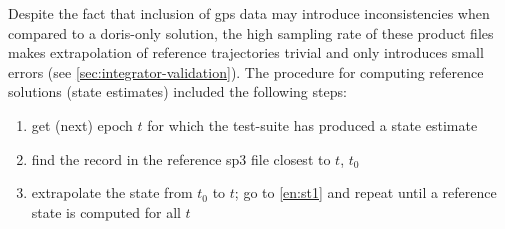 Despite the fact that inclusion of \gls{gps} data may introduce inconsistencies 
when compared to a \gls{doris}-only solution, the high sampling rate of these 
product files makes extrapolation of reference trajectories trivial and only introduces 
small errors (see \autoref{sec:integrator-validation}). The procedure for computing 
reference solutions (state estimates) included the following steps:
\begin{enumerate}
  \item \label{en:st1} get (next) epoch $t$ for which the test-suite has produced a state estimate
  \item find the record in the reference sp3 file closest to $t$, $t_0$
  \item extrapolate the state from $t_0$ to $t$; go to \autoref{en:st1} and repeat 
    until a reference state is computed for all $t$
\end{enumerate}
